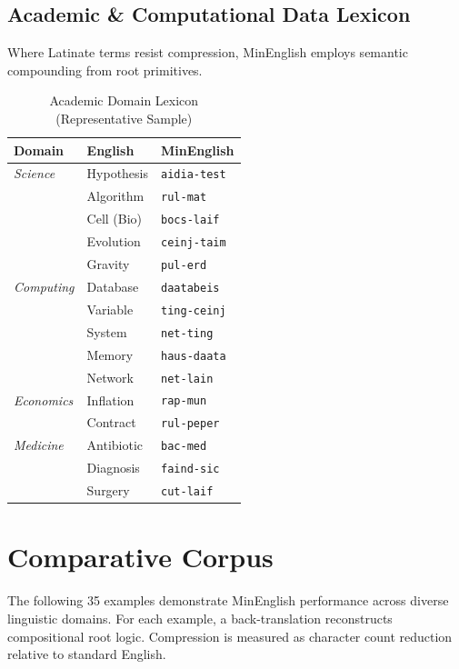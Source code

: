 \documentclass[10pt,twocolumn,letterpaper]{article}
\newcommand{\me}[1]{\texttt{#1}}
\begin{document}
\subsection{Academic \& Computational Data Lexicon}

Where Latinate terms resist compression, MinEnglish employs semantic compounding from root primitives.

\begin{table}[h!]
\centering\small
\begin{tabularx}{\linewidth}{lXl}
\toprule
\textbf{Domain} & \textbf{English} & \textbf{MinEnglish} \\
\midrule
\textit{Science}    & Hypothesis  & \me{aidia-test}  \\
                    & Algorithm   & \me{rul-mat}     \\
                    & Cell (Bio)  & \me{bocs-laif}   \\
                    & Evolution   & \me{ceinj-taim}  \\
                    & Gravity     & \me{pul-erd}     \\
\midrule
\textit{Computing}  & Database    & \me{daatabeis}   \\
                    & Variable    & \me{ting-ceinj}  \\
                    & System      & \me{net-ting}    \\
                    & Memory      & \me{haus-daata}  \\
                    & Network     & \me{net-lain}    \\
\midrule
\textit{Economics}  & Inflation   & \me{rap-mun}     \\
                    & Contract    & \me{rul-peper}   \\
\midrule
\textit{Medicine}   & Antibiotic  & \me{bac-med}     \\
                    & Diagnosis   & \me{faind-sic}   \\
                    & Surgery     & \me{cut-laif}    \\
\bottomrule
\end{tabularx}
\caption{Academic Domain Lexicon (Representative Sample)}
\end{table}

\section{Comparative Corpus}

The following 35 examples demonstrate MinEnglish performance across diverse linguistic domains. For each example, a back-translation reconstructs compositional root logic. Compression is measured as character count reduction relative to standard English.
\end{document}

